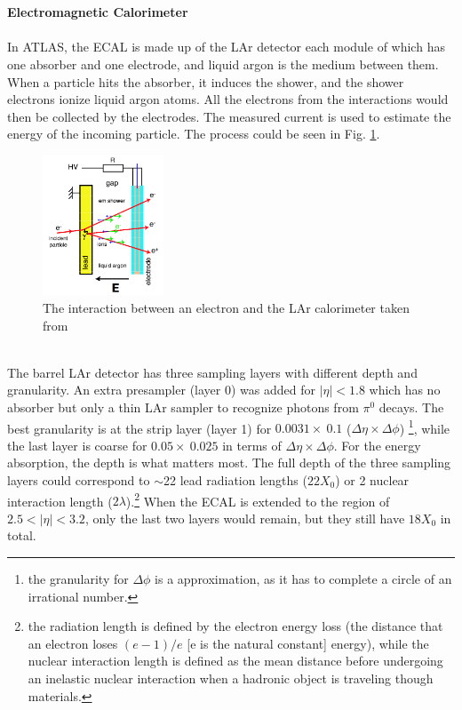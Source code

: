 \\
\\{\bf Electromagnetic Calorimeter}
\\
\\In ATLAS, the ECAL is made up of the LAr detector\cite{ATLAS:1996ab} each module of which has one absorber and one electrode, and liquid argon is the medium between them. When a particle hits the absorber, it induces the shower, and the shower electrons ionize liquid argon atoms. All the electrons from the interactions would then be collected by the electrodes. The measured current is used to estimate the energy of the incoming particle. The process could be seen in Fig. \ref{Fig:larshower}.\\
\begin{figure}[!h]                
	\includegraphics[width=0.32\textwidth]{Chapter2/LArshower}
	\centering
	\begin{center}
		\caption{The interaction between an electron and the LAr calorimeter taken from \cite{LArwork}}
		\label{Fig:larshower}            
	\end{center}
\end{figure}
\\The barrel LAr detector has three sampling layers with different depth and granularity. An extra presampler (layer 0) was added for $|\eta|<1.8$ which has no absorber but only a thin LAr sampler to recognize photons from $\pi^{0}$ decays. The best granularity is at the strip layer (layer 1) for $0.0031\times ~0.1$ ($\Delta \eta \times \Delta \phi$) \footnote{the granularity for $\Delta \phi$ is a approximation, as it has to complete a circle of an irrational number.}, while the last layer is coarse for $0.05 \times ~0.025$ in terms of $\Delta \eta \times \Delta \phi$. For the energy absorption, the depth is what matters most. The full depth of the three sampling layers could correspond to $\sim$22 lead radiation lengths ($22X_{0}$) or 2 nuclear interaction length ($2\lambda$).\footnote{the radiation length is defined by the electron energy loss (the distance that an electron loses $(e-1)/e$  [e is the natural constant] energy), while the nuclear interaction length is defined as the mean distance before undergoing an inelastic nuclear interaction when a hadronic object is traveling though materials.} When the ECAL is extended to the region of $2.5<|\eta|<3.2$, only the last two layers would remain, but they still have $18X_{0}$ in total.
